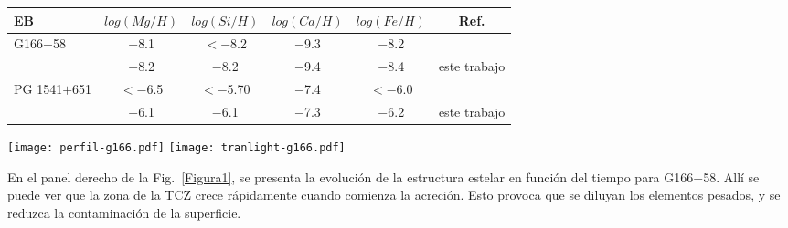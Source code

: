 \documentclass[baaa]{baaa}
\begin{document}
\begin{table*}
\centering
\caption{Abundancias de la literatura y obtenidas en este trabajo con el LPCODE para los objetos de la muestra.}
\begin{tabular}{lccccc}
\hline\hline\noalign{\smallskip}
\!\!EB & \!\!\!\!$log(Mg/H)$ & \!\!\!\!$log(Si/H)$ & \!\!\!\!$log(Ca/H)$ & \!\!\!\!$log(Fe/H)$ & \!\!\!\!Ref.\\
\hline\noalign{\smallskip}
\!\!G166$-$58  & $-$8.1 & $<-$8.2 & $-$9.3 & $-$8.2 & \cite{2019AJ....158..242X} \\
& $-$8.2 & $-$8.2 & $-$9.4 & $-$8.4 & este trabajo \\
\!\!PG 1541$+$651  & $<-$6.5  &  $< -$5.70 & $-$7.4 & $<-$6.0 & \cite{2019AJ....158..242X} \\
& $-$6.1 & $-$6.1 & $-$7.3 & $-$6.2 & este trabajo \\   
\hline
\end{tabular}
\label{tabla2}
\end{table*}

 \begin{figure*}[!t]
\centering
\texttt{[image: perfil-g166.pdf]} %
\texttt{[image: tranlight-g166.pdf]}
\caption{\emph{Panel izquierdo:} Abundancia de los distintos elementos químicos analizados en función de la profundidad, para G166$-$58. En color rojo, se presenta la zona convectiva (CZ) y en azul la zona de la convección termohalina (TCZ). \emph{Panel derecho:} Evolución de la estructura estelar en función del tiempo, para G166$-$58. En color rojo, se presenta la zona convectiva y en azul la región de la convección termohalina.}
\label{Figura1}
\end{figure*}

En el panel derecho de la Fig.~\ref{Figura1}, se presenta la evolución de la estructura estelar en función del tiempo para G166$-$58. Allí se puede ver que la zona de la TCZ crece rápidamente cuando comienza la acreción. Esto provoca que se diluyan los elementos pesados, y se reduzca la contaminación de la superficie.

\end{document}
